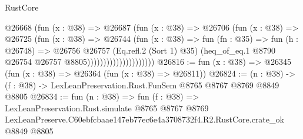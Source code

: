 \begin{lexlean}{RustCore}
\begin{coremodule}
                                @26668
                                  (fun (x : @38) =>
                                  @26687
                                    (fun (x : @38) =>
                                    @26706
                                      (fun (x : @38) =>
                                      @26725
                                        (fun (x : @38) =>
                                        @26744
                                          (fun (x : @38) =>
                                          fun (fn : @35) =>
                                          fun (h : @26748) =>
                                          @26756
                                            @26757
                                            (Eq.refl.{2} (Sort 1) @35)
                                            (heq_of_eq.{1}
                                              @8790
                                              @26754
                                              @26757
                                              @8805)))))))))))))))))))))
@26816 := fun (x : @38) => @26345 (fun (x : @38) => @26364 (fun (x : @38) => @26811))
@26824 := (n : @38) -> (f : @38) -> LexLeanPreservation.Rust.FunSem @8765 @8767 @8769 @8849 @8805
@26834 := fun (n : @38) =>
  fun (f : @38) =>
  LexLeanPreservation.Rust.simulate
    @8765
    @8767
    @8769
    LexLeanPreserve.C60ebfcbaae147eb77ec6e4a3708732f4.R2.RustCore.crate_ok
    @8849
    @8805
\end{coremodule}
\end{lexlean}

